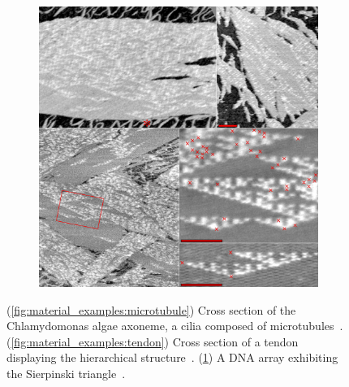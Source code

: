 \begin{figure}
\begin{subfigure}{0.32\linewidth}
    \includegraphics[height=\myMinHeight]{img/Rothemund-DNA-SierpinskiGasket}
    \caption{}\label{fig:material_examples:sierpinski}
  \end{subfigure}%
  \caption{(\ref{fig:material_examples:microtubule}) Cross section of the Chlamydomonas algae axoneme, a cilia composed of microtubules~\cite{wikimediacommons2007cilia}. (\ref{fig:material_examples:tendon}) Cross section of a tendon displaying the hierarchical structure~\cite{lecture_biosolid_mechanics}. (\ref{fig:material_examples:sierpinski}) A DNA array exhibiting the Sierpinski triangle~\cite{wikimediacommons2007dna}.}\label{fig:material_examples}
\end{figure}%




